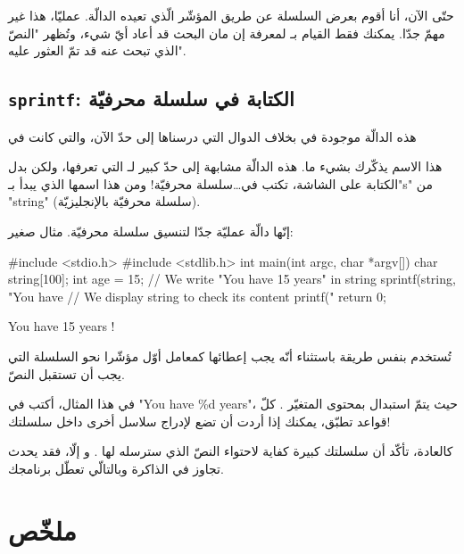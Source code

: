 حتّى الآن، أنا أقوم بعرض السلسلة عن طريق المؤشّر الّذي تعيده الدالّة. عمليّا، هذا غير مهمّ جدّا. يمكنك فقط القيام بـ
لمعرفة إن مان البحث قد أعاد أيّ شيء، وتُظهر "النصّ الذي تبحث عنه قد تمّ العثور عليه".

\subsection{\texttt{sprintf}: الكتابة في سلسلة محرفيّة}

\begin{information}
  هذه الدالّة موجودة في
  بخلاف الدوال التي درسناها إلى حدّ الآن، والتي كانت في
\end{information}

هذا الاسم يذكّرك بشيء ما. هذه الدالّة مشابهة إلى حدّ كبير لـ
التي تعرفها، ولكن بدل الكتابة على الشاشة،
تكتب في\dots سلسلة محرفيّة! ومن هذا اسمها الذي يبدأ بـ"\textenglish{s}" من "\textenglish{string}" (سلسلة محرفيّة بالإنجليزيّة).

إنّها دالّة عمليّة جدّا لتنسيق سلسلة محرفيّة. مثال صغير:

\begin{Csource}
#include <stdio.h>
#include <stdlib.h>
int main(int argc, char *argv[])
{
	char string[100];
	int age = 15;
	// We write "You have 15 years" in string
	sprintf(string, "You have %
	// We display string to check its content
	printf("%
	return 0;
}
\end{Csource}

\begin{Console}
You have 15 years !
\end{Console}

تُستخدم بنفس طريقة
باستثناء أنّه يجب إعطائها كمعامل أوّل مؤشّرا نحو السلسلة التي يجب أن تستقبل النصّ.

في هذا المثال، أكتب في
"\textenglish{You have \%d years}"،
حيث يتمّ استبدال
بمحتوى المتغيّر
.
كلّ قواعد
تطبّق، يمكنك إذا أردت أن تضع
لإدراج سلاسل أخرى داخل سلسلتك!

كالعادة، تأكّد أن سلسلتك كبيرة كفاية لاحتواء النصّ الذي سترسله لها
.
و إلّا، فقد يحدث تجاوز في الذاكرة وبالتالّي تعطّل برنامجك.

\section*{ملخّص}


